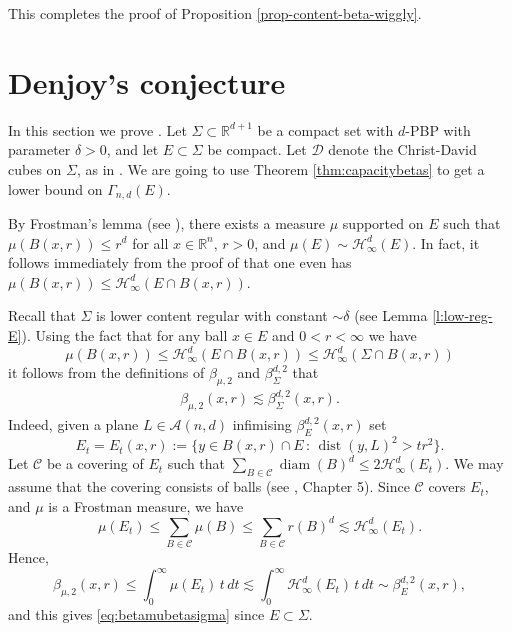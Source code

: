 \documentclass[11pt,reqno]{amsart}
\def\dC{{\mathcal{C}}}
\DeclareMathOperator{\diam}{diam}
\def\dist{\mathop\mathrm{dist}} 						%
\theoremstyle{definition}
\theoremstyle{remark}
\numberwithin{equation}{section}
\newcommand{\R}{\mathbb{R}}
\newcommand{\hdc}{\mathcal{H}^d_\infty}
\newcommand{\DD}{\mathcal{D}}
\newcommand{\dH}{\mathcal{H}}
\theoremstyle{theorem}
\theoremstyle{definition}
\theoremstyle{remark}
\numberwithin{equation}{section}
\begin{document}
	This completes the proof of Proposition \ref{prop-content-beta-wiggly}. 	
	
	\section{Denjoy's conjecture}\label{s:cap}
	In this section we prove . 
	Let $\Sigma \subset \R^{d+1}$ be a compact set with $d$-PBP with parameter $\delta>0$, and let $E \subset \Sigma$ be compact. Let $\DD$ denote the Christ-David cubes on $\Sigma$, as in . We are going to use Theorem \ref{thm:capacitybetas} to get a lower bound on $\Gamma_{n,d}(E)$.
	
	By Frostman's lemma (see \cite[Lemma 1.23]{tolsa2014analytic}), there exists a measure $\mu$ supported on $E$ such that $\mu(B(x,r)) \leq r^d$ for all $x\in \R^n,\, r>0$, and $\mu(E) \sim \dH_\infty^d(E)$. In fact, it follows immediately from the proof of \cite[Lemma 1.23]{tolsa2014analytic} that one even has $\mu(B(x,r)) \leq \hdc(E\cap B(x,r))$. 
	
	Recall that $\Sigma$ is lower content regular with constant $\sim\delta$ (see Lemma \ref{l:low-reg-E}). Using the fact that for any ball $x\in E$ and $0<r<\infty$ we have
	\begin{equation*}
	\mu(B(x,r)) \leq \hdc(E\cap B(x,r))\le \hdc(\Sigma \cap B(x,r))
	\end{equation*}
	it follows from the definitions of $\beta_{\mu,2}$ and $\beta_\Sigma^{d,2}$ that 
	\begin{align}\label{eq:betamubetasigma}
	\beta_{\mu,2}(x,r) \lesssim \beta_\Sigma^{d,2}(x,r).
	\end{align}
 Indeed, given a plane $L\in\mathcal{A}(n,d)$ infimising $\beta_E^{d,2}(x,r)$ set 
 \begin{equation*}
 E_t=E_t(x,r):=\{y \in B(x,r) \cap E \, : \, \dist(y, L)^2 > t r^2 \}.
 \end{equation*}
 Let $\dC$ be a covering of $E_t$ such that $\sum_{B \in \dC} \diam(B)^d \leq 2\hdc(E_t)$. We may assume that the covering consists of balls (see \cite{mattila}, Chapter 5). Since $\dC$ covers $E_t$, and $\mu$ is a Frostman measure, we have
 \begin{equation*}
 	\mu(E_t) \leq \sum_{B \in \dC} \mu(B) \le  \sum_{B \in \dC} r(B)^d \lesssim  \hdc(E_t).
 	\end{equation*}
 Hence, 
 \begin{equation*}
 	\beta_{\mu,2}(x,r)  \leq \int_0^\infty \mu(E_t)\,t \,dt
 	 \lesssim \int_0^\infty \hdc(E_t)\,t \, dt \sim \beta_E^{d,2}(x,r),
 \end{equation*}
and this gives \eqref{eq:betamubetasigma} since $E \subset \Sigma$.
	
\end{document}
